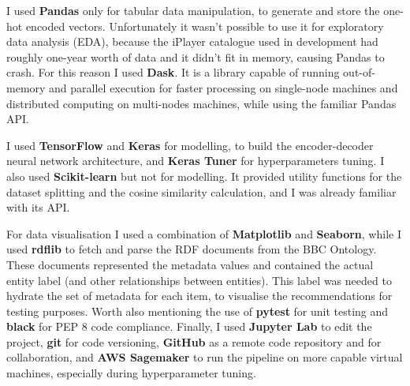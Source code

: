 I used \textbf{Pandas} only for tabular data manipulation, to generate and store the one-hot encoded vectors. Unfortunately it wasn't possible
to use it for exploratory data analysis (EDA), because the iPlayer catalogue used in development had roughly one-year worth of data and it didn't
fit in memory, causing Pandas to crash. For this reason I used \textbf{Dask}. It is a library capable of running out-of-memory and
parallel execution for faster processing on single-node machines and distributed computing on multi-nodes machines, while using the familiar Pandas API.

I used \textbf{TensorFlow} and \textbf{Keras} for modelling, to build the encoder-decoder neural network architecture, and \textbf{Keras Tuner} for
hyperparameters tuning. I also used \textbf{Scikit-learn} but not for modelling. It provided utility functions for the dataset splitting and
the cosine similarity calculation, and I was already familiar with its API.

For data visualisation I used a combination of \textbf{Matplotlib} and \textbf{Seaborn}, while I used \textbf{rdflib} to fetch and parse
the RDF documents from the BBC Ontology. These documents represented the metadata values and contained the actual entity label (and other
relationships between entities).
This label was needed to hydrate the set of metadata for each item, to visualise the recommendations for testing purposes.
Worth also mentioning the use of \textbf{pytest} for unit testing and \textbf{black} for PEP 8 code compliance.
Finally, I used \textbf{Jupyter Lab} to edit the project, \textbf{git} for code versioning, \textbf{GitHub} as a remote code repository
and for collaboration, and \textbf{AWS Sagemaker} to run the pipeline on more capable virtual machines, especially during hyperparameter tuning.
